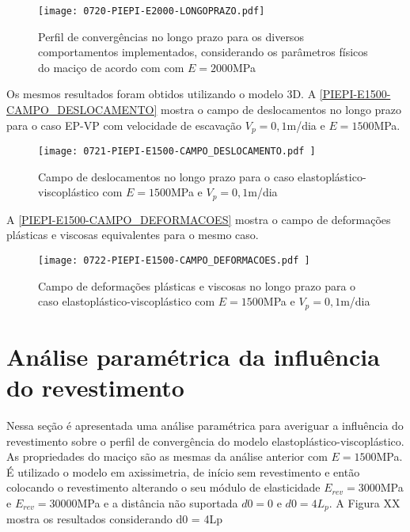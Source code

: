 \begin{figure}[H]
	\begin{center}
		\texttt{[image: 0720-PIEPI-E2000-LONGOPRAZO.pdf]}
	\end{center}
	\caption{\label{PIEPI-E2000-LONGOPRAZO}Perfil de convergências no longo prazo para os diversos comportamentos implementados, considerando os parâmetros físicos do maciço de acordo com  com $E=2000$MPa}
\end{figure}

Os mesmos resultados foram obtidos utilizando o modelo 3D. A \autoref{PIEPI-E1500-CAMPO_DESLOCAMENTO} mostra o campo de deslocamentos no longo prazo para o caso EP-VP com velocidade de escavação $V_p=0,1$m/dia e $E=1500$MPa.

\begin{figure}[H]
	\begin{center}
		\texttt{[image: 0721-PIEPI-E1500-CAMPO\_DESLOCAMENTO.pdf
		]}
	\end{center}
	\caption{\label{PIEPI-E1500-CAMPO_DESLOCAMENTO}Campo de deslocamentos no longo prazo para o caso elastoplástico-viscoplástico com $E=1500$MPa e $V_p=0,1$m/dia}
\end{figure}

A \autoref{PIEPI-E1500-CAMPO_DEFORMACOES} mostra o campo de deformações plásticas e viscosas equivalentes para o mesmo caso.

\begin{figure}[H]
	\begin{center}
		\texttt{[image: 0722-PIEPI-E1500-CAMPO\_DEFORMACOES.pdf
		]}
	\end{center}
	\caption{\label{PIEPI-E1500-CAMPO_DEFORMACOES}Campo de deformações plásticas e viscosas no longo prazo para o caso elastoplástico-viscoplástico com $E=1500$MPa e $V_p=0,1$m/dia}
\end{figure}

\section{Análise paramétrica da influência do revestimento}

Nessa seção é apresentada uma análise paramétrica para averiguar a influência do revestimento sobre o perfil de convergência do modelo elastoplástico-viscoplástico. As propriedades do maciço são as mesmas da análise anterior com $E=1500$MPa. É utilizado o modelo em axissimetria, de início sem revestimento e então colocando o revestimento alterando o seu módulo de elasticidade $E_{rev} = 3000$MPa e $E_{rev} = 30000$MPa e a distância não suportada $d0 = 0$ e $d0 = 4L_p$. A Figura XX mostra os resultados considerando d0 = 4Lp

